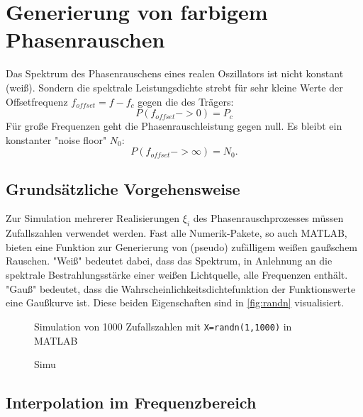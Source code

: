 \section{Generierung von farbigem Phasenrauschen}
Das Spektrum des Phasenrauschens eines realen Oszillators ist nicht konstant (weiß). Sondern die spektrale Leistungsdichte strebt für sehr kleine Werte der Offsetfrequenz $f_{offset}=f-f_c$ gegen die des Trägers:
\begin{equation}
P(f_{offset} -> 0) = P_c
\end{equation}
Für große Frequenzen geht die Phasenrauschleistung gegen null. Es bleibt ein konstanter "noise floor" $N_0$:
\begin{equation}
	P(f_{offset} -> \infty) = N_0.
\end{equation}

\subsection{Grundsätzliche Vorgehensweise}
Zur Simulation mehrerer Realisierungen $\xi_i$ des Phasenrauschprozesses müssen Zufallszahlen verwendet werden. Fast alle Numerik-Pakete, so auch MATLAB, bieten eine Funktion zur Generierung von (pseudo) zufälligem weißen gaußschem Rauschen. "Weiß" bedeutet dabei, dass das Spektrum, in Anlehnung an die spektrale Bestrahlungsstärke einer weißen Lichtquelle, alle Frequenzen enthält. "Gauß" bedeutet, dass die Wahrscheinlichkeitsdichtefunktion der Funktionswerte eine Gaußkurve ist. Diese beiden Eigenschaften sind in \autoref{fig:randn} visualisiert.

\begin{figure}[H]
	\centering
	\hfill
	\caption[MATLAB randn]{Simulation von 1000 Zufallszahlen mit \texttt{X=randn(1,1000)} in MATLAB}
	\label{fig:randn}
\end{figure}





\begin{figure}[H]
	\centering
	\caption[Simulation]{Simu}
	\label{fig:aaa}
\end{figure}


\subsection{Interpolation im Frequenzbereich}

